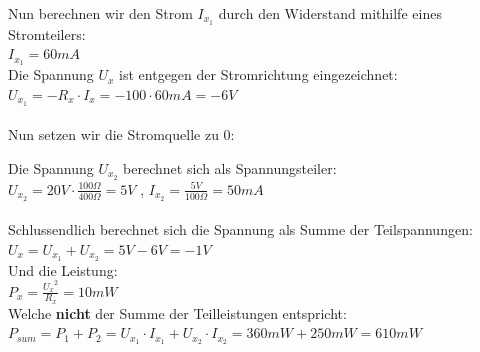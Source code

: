 						Nun berechnen wir den Strom $I_{x_1}$ durch den Widerstand mithilfe eines Stromteilers: \\
						$I_{x_1} = 60mA$ \\
						Die Spannung $U_x$ ist entgegen der Stromrichtung eingezeichnet: \\
						$U_{x_1} = - R_x \cdot I_x = - 100 \cdot 60mA = -6V $ \\
						\\
						Nun setzen wir die Stromquelle zu 0: \\
						\begin{center}
							\fix
						\end{center}

						Die Spannung $U_{x_2}$ berechnet sich als Spannungsteiler: \\
						$U_{x_2} = 20V \cdot \frac{100\Omega}{400\Omega} = 5V$ , $ I_{x_2} = \frac{5V}{100\Omega} = 50mA $\\
						\\
						Schlussendlich berechnet sich die Spannung als Summe der Teilspannungen:
						$U_x = U_{x_1} + U_{x_2} = 5V -6V = -1V $ \\
						Und die Leistung: \\
						$P_x = \frac{{U_x}^2}{R_x} = 10mW$ \\
						Welche \textbf{nicht} der Summe der Teilleistungen entspricht: \\
						$P_{sum} = P_1 + P_2 = U_{x_1} \cdot I_{x_1} + U_{x_2} \cdot I_{x_2} = 360mW + 250mW = 610mW$


					 \iend

